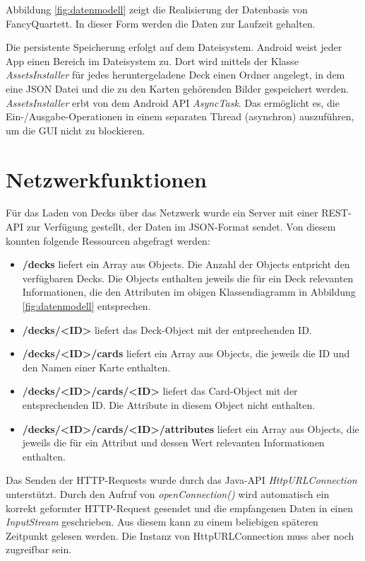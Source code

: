 Abbildung \ref{fig:datenmodell} zeigt die Realisierung der Datenbasis von FancyQuartett. In dieser Form werden die Daten zur Laufzeit gehalten.

Die persistente Speicherung erfolgt auf dem Dateisystem. Android weist jeder App einen Bereich im Dateisystem zu. Dort wird mittels der Klasse \emph{AssetsInstaller} für jedes heruntergeladene Deck einen Ordner angelegt, in dem eine JSON Datei und die zu den Karten gehörenden Bilder gespeichert werden. \emph{AssetsInstaller} erbt von dem Android API \emph{AsyncTask}. Das ermöglicht es, die Ein-/Ausgabe-Operationen in einem separaten Thread (asynchron) auszuführen, um die GUI nicht zu blockieren.

\section{Netzwerkfunktionen}
\label{sec:netzwerkfunktionen}

Für das Laden von Decks über das Netzwerk wurde ein Server mit einer REST-API zur Verfügung gestellt, der Daten im JSON-Format sendet. Von diesem konnten folgende Ressourcen abgefragt werden:
\begin{itemize}
    \item \textbf{/decks} liefert ein Array aus Objects. Die Anzahl der Objects entpricht den verfügbaren Decks. Die Objects enthalten jeweils die für ein Deck relevanten Informationen, die den Attributen im obigen Klassendiagramm in Abbildung \ref{fig:datenmodell} entsprechen.
    \item \textbf{/decks/<ID>} liefert das Deck-Object mit der entprechenden ID.
    \item \textbf{/decks/<ID>/cards} liefert ein Array aus Objects, die jeweils die ID und den Namen einer Karte enthalten.
    \item \textbf{/decks/<ID>/cards/<ID>} liefert das Card-Object mit der entsprechenden ID. Die Attribute in diesem Object nicht enthalten.
    \item \textbf{/decks/<ID>/cards/<ID>/attributes} liefert ein Array aus Objects, die jeweils die für ein Attribut und dessen Wert relevanten Informationen enthalten.
\end{itemize}

Das Senden der HTTP-Requests wurde durch das Java-API \emph{HttpURLConnection} unterstützt. Durch den Aufruf von \emph{openConnection()} wird automatisch ein korrekt geformter HTTP-Request gesendet und die empfangenen Daten in einen \emph{InputStream} geschrieben. Aus diesem kann zu einem beliebigen späteren Zeitpunkt gelesen werden. Die Instanz von HttpURLConnection muss aber noch zugreifbar sein.

